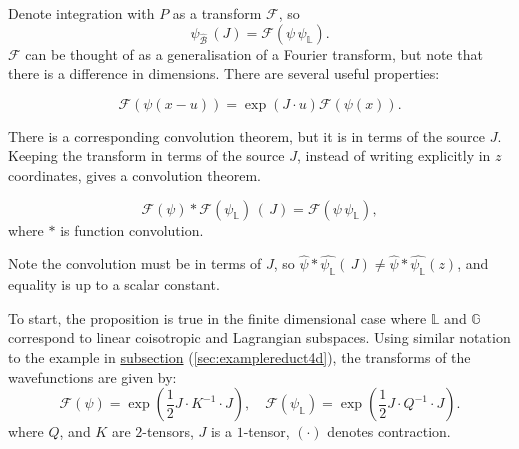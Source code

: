     Denote integration with \(P\) as a transform \( \mathcal{F}\), so
    \[ \psi_{\widehat{\mathcal{B}}}\,(J) =  \mathcal{F} ( \psi \, \psi_{\mathbb{L}}).\]
    \( \mathcal{F}\) can be thought of as a generalisation of a Fourier transform, but note that there is a difference in dimensions. There are several useful properties:
    
    \begin{prop}
    \[ \mathcal{F}(\psi(x-u)) = \exp(J \cdot u) \mathcal{F} (\psi(x)).\]
    \end{prop}
    
    
    There is a corresponding convolution theorem, but it is in terms of the source \(J\). Keeping the transform in terms of the source \(J\), instead of writing explicitly in \(z\) coordinates, gives a convolution theorem.
    \begin{prop}
    \[ \mathcal{F}(\psi) * \mathcal{F}(\psi_{\mathbb{L}})\, (\, J) =   \mathcal{F}(\psi \,  \psi_{\mathbb{L}}),\]
    where \(*\) is function convolution.
    \end{prop}
    
    
    
    Note the convolution must be in terms of \(J\), so \(\widehat{\psi} * \widehat{\psi_{\mathbb{L}}}(\, J) \neq \widehat{\psi} * \widehat{\psi_{\mathbb{L}}}(z)\), and equality is up to a scalar constant. 
    
    To start, the proposition is true in the finite dimensional case where \(\mathbb{L}\) and \( \mathbb{G}\) correspond to linear coisotropic and Lagrangian subspaces. Using similar notation to the example in \hyperref[sec:examplereduct4d]{subsection} (\ref{sec:examplereduct4d}), the transforms of the wavefunctions are given by:
    \[ \mathcal{F}(\psi) = \exp\left( \frac{1}{2} J \cdot K^{-1} \cdot J \right) , \quad  \mathcal{F}(\psi_{\mathbb{L}}) = \exp \left( \frac{1}{2} J \cdot Q^{-1} \cdot J \right). \] 
    where \(Q\), and \(K\) are \(2\)-tensors, \(J\) is a \(1\)-tensor, \((\cdot)\) denotes contraction.
    
